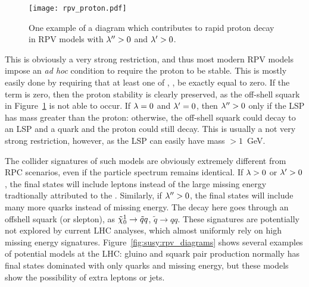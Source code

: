 
\begin{figure}
\centering
\texttt{[image: rpv\_proton.pdf]}
\label{fig:susy:rpv_proton}
\caption{One example of a diagram which contributes to rapid proton decay in RPV models with $\lambda^{\prime\prime} > 0$ and $\lambda^{\prime} > 0$.}
\end{figure}

This is obviously a very strong restriction, and thus most modern RPV models impose an \textit{ad hoc} condition to require the proton to be stable. This is mostly easily done by requiring that at least one of \lam, \lamp, \lampp be exactly equal to zero. If the \lampp term is zero, then the proton stability is clearly preserved, as the off-shell squark in Figure~\ref{fig:susy:rpv_proton} is not able to occur. If $\lambda = 0$ and $\lambda^{\prime} = 0$, then $\lambda^{\prime\prime} > 0$ only if the LSP has mass greater than the proton: otherwise, the off-shell squark could decay to an LSP and a quark and the proton could still decay. This is usually a not very strong restriction, however, as the LSP can easily have mass $> 1$~GeV.

The collider signatures of such models are obviously extremely different from RPC scenarios, even if the particle spectrum remains identical. If $\lambda > 0$ or $\lambda^{\prime} > 0$, the final states will include leptons instead of the large missing energy tradtionally attributed to the \lsp. Similarly, if $\lambda^{\prime\prime} > 0$, the final states will include many more quarks instead of missing energy. The decay here goes through an offshell squark (or slepton), as $\tilde{\chi}_0^1 \rightarrow \tilde{q} q$, $\tilde{q}\rightarrow q q$. These signatures are potentially not explored by current LHC analyses, which almost uniformly rely on high missing energy signatures. Figure~\ref{fig:susy:rpv_diagrams} shows several examples of potential models at the LHC: gluino and squark pair production normally has final states dominated with only quarks and missing energy, but these models show the possibility of extra leptons or jets.



